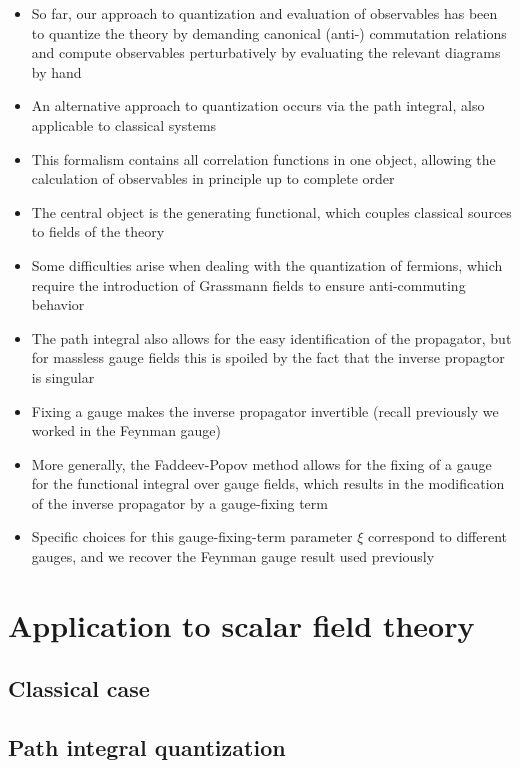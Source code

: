 \documentclass[12pt]{memoir}
\begin{document}
\begin{itemize}
  \item So far, our approach to quantization and evaluation of observables has been
    to quantize the theory by demanding canonical (anti-) commutation relations
    and compute observables perturbatively by evaluating the relevant diagrams by hand
  \item An alternative approach to quantization occurs via the path integral,
    also applicable to classical systems
  \item This formalism contains all correlation functions in one object,
    allowing the calculation of observables in principle up to complete order
  \item The central object is the generating functional,
    which couples classical sources to fields of the theory
  \item Some difficulties arise when dealing with the quantization of fermions,
    which require the introduction of Grassmann fields to ensure anti-commuting behavior
  \item The path integral also allows for the easy identification of the propagator,
    but for massless gauge fields this is spoiled by the fact that the inverse propagtor is singular
  \item Fixing a gauge makes the inverse propagator invertible (recall previously we worked in the Feynman gauge)
  \item More generally, the Faddeev-Popov method allows for the fixing of a gauge
    for the functional integral over gauge fields,
    which results in the modification of the inverse propagator by a gauge-fixing term
  \item Specific choices for this gauge-fixing-term parameter $\xi$ correspond to different gauges,
    and we recover the Feynman gauge result used previously
\end{itemize}

\section{Application to scalar field theory}

\subsection{Classical case}

\subsection{Path integral quantization}
\end{document}
